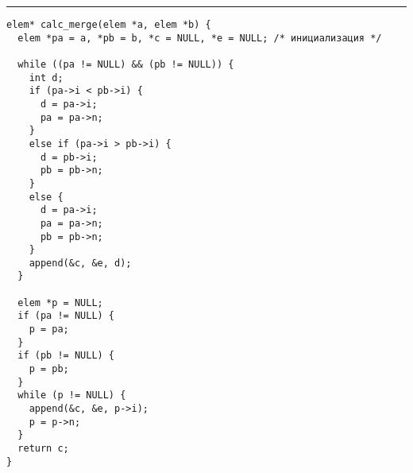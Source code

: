 \documentclass{article}
\begin{document}
\lstset{language = C,
    extendedchars = \true,
    keepspaces = true,
    breaklines=true,
    frame=lines}
\hrule
\begin{lstlisting}[title=\textbf {Алгоритм 1.2} Построение бинарного кода Грея]
elem* calc_merge(elem *a, elem *b) {
  elem *pa = a, *pb = b, *c = NULL, *e = NULL; /* инициализация */

  while ((pa != NULL) && (pb != NULL)) {
    int d;
    if (pa->i < pb->i) {
      d = pa->i;
      pa = pa->n;
    }
    else if (pa->i > pb->i) {
      d = pb->i;
      pb = pb->n;
    }
    else {
      d = pa->i;
      pa = pa->n;
      pb = pb->n;
    }
    append(&c, &e, d);
  }

  elem *p = NULL;
  if (pa != NULL) {
    p = pa;
  }
  if (pb != NULL) {
    p = pb;
  }
  while (p != NULL) {
    append(&c, &e, p->i);
    p = p->n;
  }
  return c;
}
\end{lstlisting}
\end{document}
